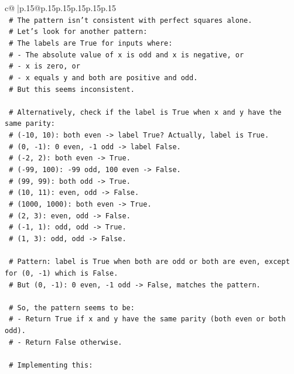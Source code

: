 \documentclass{article}
\begin{document}
{\begin{supertabular}{c@{$\;$}|p{.15\linewidth}@{}p{.15\linewidth}p{.15\linewidth}p{.15\linewidth}p{.15\linewidth}p{.15\linewidth}}
{{{\\ 
\texttt{    \# The pattern isn't consistent with perfect squares alone.} \\
\texttt{    \# Let's look for another pattern:} \\
\texttt{    \# The labels are True for inputs where:} \\
\texttt{    \# {-} The absolute value of x is odd and x is negative, or} \\
\texttt{    \# {-} x is zero, or} \\
\texttt{    \# {-} x equals y and both are positive and odd.} \\
\texttt{    \# But this seems inconsistent.} \\
\\ 
\texttt{    \# Alternatively, check if the label is True when x and y have the same parity:} \\
\texttt{    \# ({-}10, 10): both even {-}> label True? Actually, label is True.} \\
\texttt{    \# (0, {-}1): 0 even, {-}1 odd {-}> label False.} \\
\texttt{    \# ({-}2, 2): both even {-}> True.} \\
\texttt{    \# ({-}99, 100): {-}99 odd, 100 even {-}> False.} \\
\texttt{    \# (99, 99): both odd {-}> True.} \\
\texttt{    \# (10, 11): even, odd {-}> False.} \\
\texttt{    \# (1000, 1000): both even {-}> True.} \\
\texttt{    \# (2, 3): even, odd {-}> False.} \\
\texttt{    \# ({-}1, 1): odd, odd {-}> True.} \\
\texttt{    \# (1, 3): odd, odd {-}> False.} \\
\\ 
\texttt{    \# Pattern: label is True when both are odd or both are even, except for (0, {-}1) which is False.} \\
\texttt{    \# But (0, {-}1): 0 even, {-}1 odd {-}> False, matches the pattern.} \\
\\ 
\texttt{    \# So, the pattern seems to be:} \\
\texttt{    \# {-} Return True if x and y have the same parity (both even or both odd).} \\
\texttt{    \# {-} Return False otherwise.} \\
\\ 
\texttt{    \# Implementing this:} \\
}}}
\end{supertabular}}
\end{document}
